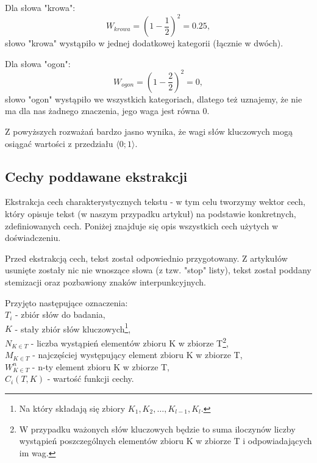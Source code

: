 \documentclass{classrep}
\begin{document}
Dla słowa "krowa":
\begin{equation}
            W_{krowa} = \left({1 - \frac{1}{2}}\right)^2 = 0.25,
\end{equation}
słowo "krowa" wystąpiło w jednej dodatkowej kategorii (łącznie w dwóch).

Dla słowa "ogon":
\begin{equation}
            W_{ogon} = \left({1 - \frac{2}{2}}\right)^2 = 0,
\end{equation}
słowo "ogon" wystąpiło we wszystkich kategoriach, dlatego też uznajemy, że nie ma dla nas żadnego znaczenia, jego waga jest równa 0. \newline

Z powyższych rozważań bardzo jasno wynika, że wagi słów kluczowych mogą osiągać wartości z przedziału $ \langle0;1\rangle $.


\subsection{Cechy poddawane ekstrakcji}

Ekstrakcja cech charakterystycznych tekstu - w tym celu tworzymy wektor cech, który opisuje tekst (w naszym przypadku artykuł) na podstawie konkretnych, zdefiniowanych cech. Poniżej znajduje się opis wszystkich cech użytych w doświadczeniu. \newline

Przed ekstrakcją cech, tekst został odpowiednio przygotowany. Z artykułów usunięte zostały nic nie wnoszące słowa (z tzw. "stop" listy), tekst został poddany stemizacji oraz pozbawiony znaków interpunkcyjnych. \newline

Przyjęto następujące oznaczenia:\\
    \quad $T_{i}$ - zbiór słów do badania,\\
    \quad $K$ - stały zbiór słów kluczowych\footnote{Na który składają się zbiory ${K_{1}, K_{2}, \ldots , K_{l-1}, K_{l}.}$}, \\
    \quad $N_{K \in T}$ - liczba wystąpień elementów zbioru K w zbiorze T\footnote{W przypadku ważonych słów kluczowych będzie to suma iloczynów liczby wystąpień poszczególnych elementów zbioru K w zbiorze T i odpowiadających im wag.}, \\
    \quad $M_{K \in T}$ - najczęściej występujący element zbioru K w zbiorze T, \\
    \quad $W^{n}_{K \in T}$ - n-ty element zbioru K w zbiorze T, \\
    \quad $C_{i}(T,K)$ - wartość funkcji cechy. \\
\end{document}

